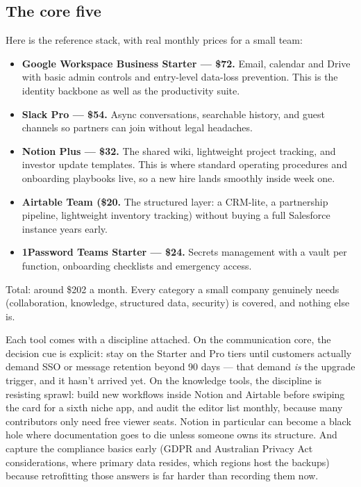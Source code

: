 \subsection{The core five}


Here is the reference stack, with real monthly prices for a small team:


\begin{itemize}[leftmargin=*]
\item \textbf{Google Workspace Business Starter — \$72.} Email, calendar and Drive with basic admin controls and entry-level data-loss prevention. This is the identity backbone as well as the productivity suite.
\item \textbf{Slack Pro — \$54.} Async conversations, searchable history, and guest channels so partners can join without legal headaches.
\item \textbf{Notion Plus — \$32.} The shared wiki, lightweight project tracking, and investor update templates. This is where standard operating procedures and onboarding playbooks live, so a new hire lands smoothly inside week one.
\item \textbf{Airtable Team (\$20.} The structured layer: a CRM-lite, a partnership pipeline, lightweight inventory tracking) without buying a full Salesforce instance years early.
\item \textbf{1Password Teams Starter — \$24.} Secrets management with a vault per function, onboarding checklists and emergency access.
\end{itemize}

Total: around \$202 a month. Every category a small company genuinely needs (collaboration, knowledge, structured data, security) is covered, and nothing else is.


Each tool comes with a discipline attached. On the communication core, the decision cue is explicit: stay on the Starter and Pro tiers until customers actually demand SSO or message retention beyond 90 days — that demand \emph{is} the upgrade trigger, and it hasn't arrived yet. On the knowledge tools, the discipline is resisting sprawl: build new workflows inside Notion and Airtable before swiping the card for a sixth niche app, and audit the editor list monthly, because many contributors only need free viewer seats. Notion in particular can become a black hole where documentation goes to die unless someone owns its structure. And capture the compliance basics early (GDPR and Australian Privacy Act considerations, where primary data resides, which regions host the backups) because retrofitting those answers is far harder than recording them now.


